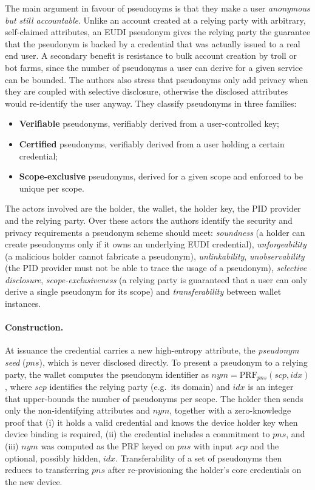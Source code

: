 \documentclass[binding=0.6cm,oneside,noexaminfo]{sapthesis}
\begin{document}
The main argument in favour of pseudonyms is that they make a user \emph{anonymous but still accountable}.
Unlike an account created at a relying party with arbitrary, self-claimed attributes, an EUDI pseudonym gives
the relying party the guarantee that the pseudonym is backed by a credential that was actually issued to a real
end user. A secondary benefit is resistance to bulk account creation by troll or bot farms, since the number of
pseudonyms a user can derive for a given service can be bounded. The authors also stress that pseudonyms only
add privacy when they are coupled with selective disclosure, otherwise the disclosed attributes would re-identify
the user anyway. They classify pseudonyms in three families:
\begin{itemize}[noitemsep]
  \item \textbf{Verifiable} pseudonyms, verifiably derived from a user-controlled key;
  \item \textbf{Certified} pseudonyms, verifiably derived from a user holding a certain credential;
  \item \textbf{Scope-exclusive} pseudonyms, derived for a given scope and enforced to be unique per scope.
\end{itemize}

The actors involved are the holder, the wallet, the holder key, the PID provider and the relying party. Over these
actors the authors identify the security and privacy requirements a pseudonym scheme should meet: \emph{soundness}
(a holder can create pseudonyms only if it owns an underlying EUDI credential), \emph{unforgeability} (a malicious
holder cannot fabricate a pseudonym), \emph{unlinkability}, \emph{unobservability} (the PID provider must not be able
to trace the usage of a pseudonym), \emph{selective disclosure}, \emph{scope-exclusiveness} (a relying party is
guaranteed that a user can only derive a single pseudonym for its scope) and \emph{transferability} between wallet
instances.

\paragraph{Construction.} At issuance the credential carries a new high-entropy attribute, the \emph{pseudonym seed}
($pns$), which is never disclosed directly. To present a pseudonym to a relying party, the wallet computes the
pseudonym identifier as $nym = \mathrm{PRF}_{pns}(scp, idx)$, where $scp$ identifies the relying party (e.g.\ its
domain) and $idx$ is an integer that upper-bounds the number of pseudonyms per scope. The holder then sends only the
non-identifying attributes and $nym$, together with a zero-knowledge proof that (i) it holds a valid credential and
knows the device holder key when device binding is required, (ii) the credential includes a commitment to $pns$, and
(iii) $nym$ was computed as the PRF keyed on $pns$ with input $scp$ and the optional, possibly hidden, $idx$.
Transferability of a set of pseudonyms then reduces to transferring $pns$ after re-provisioning the holder's core
credentials on the new device.
\end{document}

